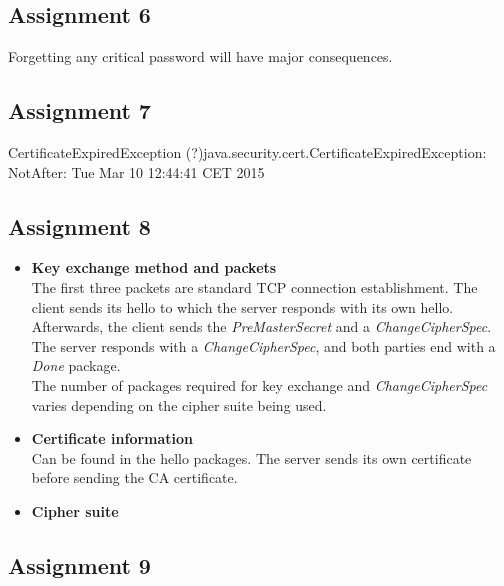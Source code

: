 \documentclass[11pt,a4paper]{article}
\begin{document}
\subsection{Assignment 6}
Forgetting any critical password will have major consequences.
\subsection{Assignment 7}
CertificateExpiredException (?)java.security.cert.CertificateExpiredException: NotAfter: Tue Mar 10 12:44:41 CET 2015
\subsection{Assignment 8} 
\begin{itemize}
\item \textbf{Key exchange method and packets}\\The first three packets are standard TCP connection establishment. The client sends its hello to which the server responds with its  own hello. Afterwards, the client sends the \textit{PreMasterSecret} and a \textit{ChangeCipherSpec}. The server responds with a \textit{ChangeCipherSpec}, and both parties end with a \textit{Done} package.
\\The number of packages required for key exchange and \textit{ChangeCipherSpec} varies depending on the cipher suite being used. 
\item \textbf{Certificate information}\\Can be found in the hello packages. The server sends its own certificate before sending the CA certificate.
\item \textbf{Cipher suite}
\end{itemize}

\subsection{Assignment 9}
\end{document}
